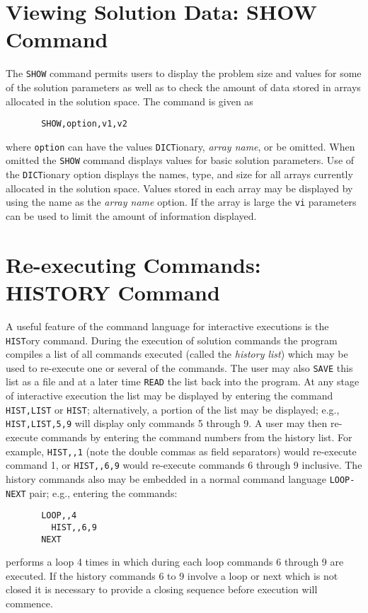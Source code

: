 \section{Viewing Solution Data: SHOW Command}
\label{show}

The {\tt SHOW} command permits users to display the problem size and values
for some of the solution parameters as well as to check the amount of data
stored in arrays allocated in the solution space.  The command is given as
\begin{verbatim}
       SHOW,option,v1,v2
\end{verbatim}
where {\tt option} can have the values {\tt DICT}ionary, {\it array name}, or 
be omitted.  When omitted the {\tt SHOW} command displays values for basic
solution parameters.  Use of the {\tt DICT}\-ion\-ary option displays the
names, type, and size for all arrays currently allocated in the solution
space.  Values stored in each array may be displayed by using the name
as the {\it array name} option.  If the array is large the {\tt vi} parameters
can be used to limit the amount of information displayed.

\section{Re-executing Commands: HISTORY Command}
\label{hist}

A useful feature of the command language for 
interactive executions is the {\tt HIST}ory command.  During the execution
of solution commands the program compiles a list of all commands 
executed (called the {\it history list}) which may be used to re-execute
one or several of the commands.  The user may also {\tt SAVE} this list
as a file and at a later time {\tt READ} the list back into the program.
At any stage of interactive execution the list may be displayed by
entering the command {\tt HIST,LIST} or {\tt HIST};
alternatively, a portion of the list
may be displayed; e.g., {\tt HIST,LIST,5,9} will display only commands
5 through 9.  A user may then re-execute commands by entering
the command numbers from the history list.  For example, {\tt HIST,,1}
(note the double commas as field separators) would re-execute
command 1, or {\tt HIST,,6,9} would re-execute commands 6 through 9
inclusive.  The history commands also may be embedded in a normal
command language {\tt LOOP-NEXT} pair;  e.g., entering the commands:
\begin{verbatim}
       LOOP,,4
         HIST,,6,9
       NEXT
\end{verbatim}
performs a loop 4 times in which during each loop commands
6 through 9 are executed.
If the history commands 6 to 9 involve a loop or next which is not
closed it is necessary to provide a closing sequence before execution
will commence.

